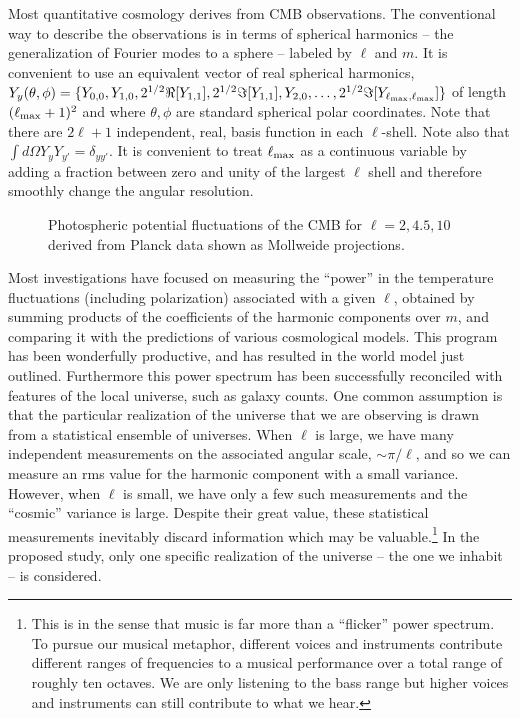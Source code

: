 \documentclass[psfig,11pt]{article}
\begin{document}
Most quantitative cosmology derives from CMB observations. The conventional way to describe the observations is in terms of spherical harmonics -- the generalization of Fourier modes to a sphere -- labeled by $\ell$ and $m$. It is convenient to use an equivalent vector of real spherical harmonics, $Y_y(\theta,\phi)=\{Y_{0,0},Y_{1,0},2^{1/2}\Re[Y_{1,1}],2^{1/2}\Im[Y_{1,1}],Y_{2,0},\dots,2^{1/2}\Im[Y_{\ell_{\rm max},\ell_{\rm max}}]\}$ of length $(\ell_{\rm max}+1)^2$ and where $\theta,\phi$ are standard spherical polar coordinates. Note that there are $2\ell+1$ independent, real, basis function in each $\ell$-shell. Note also that $\int d\Omega Y_yY_{y'}=\delta_{yy'}$. It is convenient to treat $\ell_{\rm max}$ as a continuous variable by adding a fraction between zero and unity of the largest $\ell$ shell and therefore smoothly change the angular resolution.
\begin{figure}[t]
\centering
\caption{Photospheric potential fluctuations of the CMB for $\ell=2,4.5,10$ derived from Planck data shown as Mollweide projections.}
\end{figure}

Most investigations have focused on measuring the ``power'' in the temperature fluctuations (including polarization) associated with a given $\ell$, obtained by summing products of the coefficients of the harmonic components over $m$, and comparing it with the predictions of various cosmological models. This program has been wonderfully productive, and has resulted in the world model just outlined. Furthermore this power spectrum has been successfully reconciled with features of the local universe, such as galaxy counts. One common assumption is that the particular realization of the universe that we are observing is drawn from a statistical ensemble of universes. When $\ell$ is large, we have many independent measurements on the associated angular scale, $\sim\pi/\ell$, and so we can measure an rms value for the harmonic component with a small variance. However, when $\ell$ is small, we have only a few such measurements and the ``cosmic'' variance is large. Despite their great value, these statistical measurements inevitably discard information which may be valuable.\footnote{This is in the sense that music is far more than a ``flicker'' power spectrum. To pursue our musical metaphor, different voices and instruments contribute different ranges of frequencies to a musical performance over a total range of roughly ten octaves. We are only listening to the bass range but higher voices and instruments can still contribute to what we hear.}  In the proposed study, only one specific realization of the universe -- the one we inhabit --  is considered.
\end{document}
